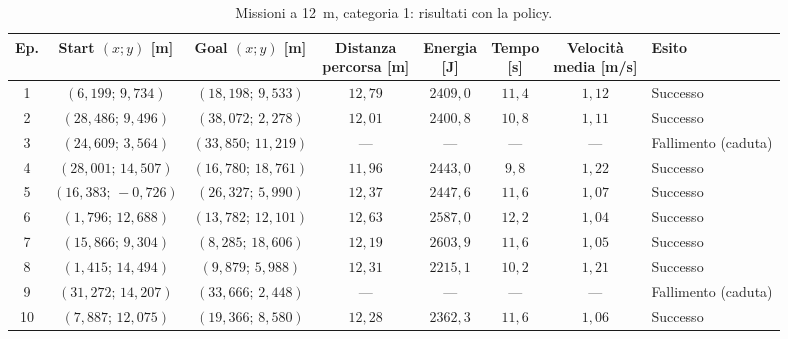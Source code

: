 \begin{table}[H]
\centering
\caption{Missioni a 12~m, categoria 1: risultati con la policy.}
\label{tab:big-map-12m-cat1}
\begingroup
\fontsize{9}{11}\selectfont
\setlength{\tabcolsep}{2.5pt}
\renewcommand{\arraystretch}{1.2}
\begin{tabular}{@{}c cc cccc l@{}}
\toprule
Ep. & \shortstack{Start $(x;y)$\\{}[m]} & \shortstack{Goal $(x;y)$\\{}[m]} & \shortstack{Distanza\\percorsa [m]} & \shortstack{Energia\\{}[J]} & \shortstack{Tempo\\{}[s]} & \shortstack{Velocità\\media [m/s]} & Esito \\
\midrule
1 & $(6{,}199;\,9{,}734)$ & $(18{,}198;\,9{,}533)$ & $12{,}79$ & $2409{,}0$ & $11{,}4$ & $1{,}12$ & Successo \\
2 & $(28{,}486;\,9{,}496)$ & $(38{,}072;\,2{,}278)$ & $12{,}01$ & $2400{,}8$ & $10{,}8$ & $1{,}11$ & Successo \\
3 & $(24{,}609;\,3{,}564)$ & $(33{,}850;\,11{,}219)$ & --- & --- & --- & --- & Fallimento (caduta) \\
4 & $(28{,}001;\,14{,}507)$ & $(16{,}780;\,18{,}761)$ & $11{,}96$ & $2443{,}0$ & $9{,}8$ & $1{,}22$ & Successo \\
5 & $(16{,}383;\,-0{,}726)$ & $(26{,}327;\,5{,}990)$ & $12{,}37$ & $2447{,}6$ & $11{,}6$ & $1{,}07$ & Successo \\
6 & $(1{,}796;\,12{,}688)$ & $(13{,}782;\,12{,}101)$ & $12{,}63$ & $2587{,}0$ & $12{,}2$ & $1{,}04$ & Successo \\
7 & $(15{,}866;\,9{,}304)$ & $(8{,}285;\,18{,}606)$ & $12{,}19$ & $2603{,}9$ & $11{,}6$ & $1{,}05$ & Successo \\
8 & $(1{,}415;\,14{,}494)$ & $(9{,}879;\,5{,}988)$ & $12{,}31$ & $2215{,}1$ & $10{,}2$ & $1{,}21$ & Successo \\
9 & $(31{,}272;\,14{,}207)$ & $(33{,}666;\,2{,}448)$ & --- & --- & --- & --- & Fallimento (caduta) \\
10 & $(7{,}887;\,12{,}075)$ & $(19{,}366;\,8{,}580)$ & $12{,}28$ & $2362{,}3$ & $11{,}6$ & $1{,}06$ & Successo \\
\bottomrule
\end{tabular}
\endgroup
\end{table}

